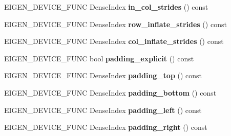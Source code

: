 \begin{DoxyCompactItemize}
E\+I\+G\+E\+N\+\_\+\+D\+E\+V\+I\+C\+E\+\_\+\+F\+U\+NC Dense\+Index {\bfseries in\+\_\+col\+\_\+strides} () const
\item 
\mbox{\label{class_eigen_1_1_tensor_image_patch_op_a86008f8a3273640025e7c5de34f62bdb}} 
E\+I\+G\+E\+N\+\_\+\+D\+E\+V\+I\+C\+E\+\_\+\+F\+U\+NC Dense\+Index {\bfseries row\+\_\+inflate\+\_\+strides} () const
\item 
\mbox{\label{class_eigen_1_1_tensor_image_patch_op_a2e7b7d2594720f63e09d67426c346e13}} 
E\+I\+G\+E\+N\+\_\+\+D\+E\+V\+I\+C\+E\+\_\+\+F\+U\+NC Dense\+Index {\bfseries col\+\_\+inflate\+\_\+strides} () const
\item 
\mbox{\label{class_eigen_1_1_tensor_image_patch_op_a7ce12cc1ce9c1937a2f041a2c2cd7b94}} 
E\+I\+G\+E\+N\+\_\+\+D\+E\+V\+I\+C\+E\+\_\+\+F\+U\+NC bool {\bfseries padding\+\_\+explicit} () const
\item 
\mbox{\label{class_eigen_1_1_tensor_image_patch_op_a42e6346cc118e9b9ff53e318a8715453}} 
E\+I\+G\+E\+N\+\_\+\+D\+E\+V\+I\+C\+E\+\_\+\+F\+U\+NC Dense\+Index {\bfseries padding\+\_\+top} () const
\item 
\mbox{\label{class_eigen_1_1_tensor_image_patch_op_ae9efac5a56b67bfac51d81f0c2cef392}} 
E\+I\+G\+E\+N\+\_\+\+D\+E\+V\+I\+C\+E\+\_\+\+F\+U\+NC Dense\+Index {\bfseries padding\+\_\+bottom} () const
\item 
\mbox{\label{class_eigen_1_1_tensor_image_patch_op_a1c66056d679b7dcc50efe7af9d600bf0}} 
E\+I\+G\+E\+N\+\_\+\+D\+E\+V\+I\+C\+E\+\_\+\+F\+U\+NC Dense\+Index {\bfseries padding\+\_\+left} () const
\item 
\mbox{\label{class_eigen_1_1_tensor_image_patch_op_ad4a8b747724bb5492a316c6e62cb0a50}} 
E\+I\+G\+E\+N\+\_\+\+D\+E\+V\+I\+C\+E\+\_\+\+F\+U\+NC Dense\+Index {\bfseries padding\+\_\+right} () const
\item 
\mbox{\label{class_eigen_1_1_tensor_image_patch_op_a2a9fc311b5bf5b8f5af3f8f2615c03e0}} 

\end{DoxyCompactItemize}
